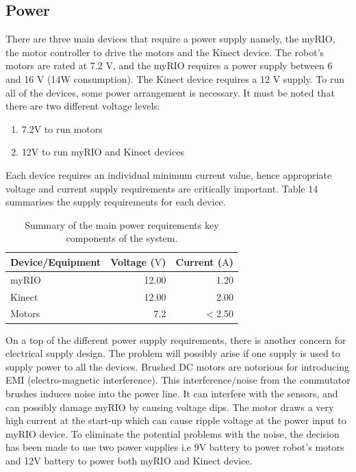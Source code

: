 \documentclass[a4paper]{article}
\begin{document}
\subsection{Power}
There are three main devices that require a power supply namely, the myRIO, the motor controller to drive the motors and the Kinect device. The robot’s motors are rated at 7.2 V, and the myRIO requires a power supply between 6 and 16 V (14W consumption). The Kinect device requires a 12 V supply. To run all of the devices, some power arrangement is necessary. It must be noted that there are two different voltage levels:
\begin{enumerate}
\item 7.2V to run motors
\item 12V to run myRIO and Kinect devices
\end{enumerate}

Each device requires an individual minimum current value, hence appropriate voltage and current supply requirements are critically important. Table 14 summarises the supply requirements for each device.
\begin{table}[h]
\centering
\caption{Summary of the main power requirements key components of the system.}
\begin{tabular}{lrr}
\toprule
\textbf{Device/Equipment} & \textbf{Voltage ($\si{\volt}$)} & \textbf{Current ($\si{\ampere}$)}\\
\midrule
myRIO & 12.00 & 1.20\\
Kinect & 12.00 & 2.00\\
Motors & 7.2 & $<$2.50\\
\bottomrule
\end{tabular}
\end{table}

On a top of the different power supply requirements, there is another concern for electrical supply design. The problem will possibly arise if one supply is used to supply power to all the devices. Brushed DC motors are notorious for introducing EMI (electro-magnetic interference). This interference/noise from the commutator brushes induces noise into the power line. It can interfere with the sensors, and can possibly damage myRIO by causing voltage dips. The motor draws a very high current at the start-up which can cause ripple voltage at the power input to myRIO device. To eliminate the potential problems with the noise, the decision has been made to use two power supplies i.e 9V battery to power robot’s motors and 12V battery to power both myRIO and Kinect device.
\end{document}
